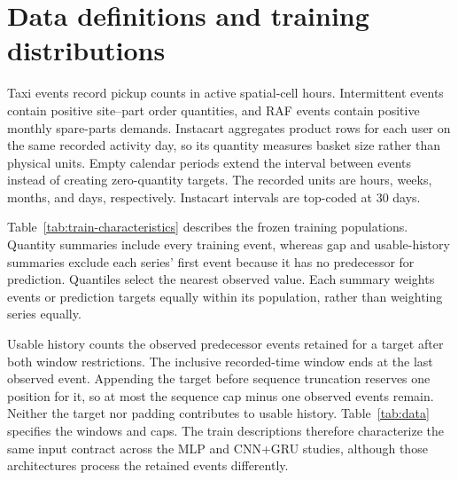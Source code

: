 \documentclass[runningheads]{llncs}
\begin{document}
\section{Data definitions and training distributions}
\label{app:data-characteristics}
Taxi events record pickup counts in active spatial-cell hours. Intermittent
events contain positive site--part order quantities, and RAF events contain
positive monthly spare-parts demands. Instacart aggregates product rows for
each user on the same recorded activity day, so its quantity measures basket
size rather than physical units. Empty calendar periods extend the interval
between events instead of creating zero-quantity targets. The recorded units
are hours, weeks, months, and days, respectively. Instacart intervals are
top-coded at 30 days.

Table~\ref{tab:train-characteristics} describes the frozen training
populations. Quantity summaries include every training event, whereas gap
and usable-history summaries exclude each series' first event because it
has no predecessor for prediction. Quantiles select the nearest observed
value. Each summary weights events or prediction targets equally within
its population, rather than weighting series equally.

Usable history counts the observed predecessor events retained for a target
after both window restrictions. The inclusive recorded-time window ends at
the last observed event. Appending the target before sequence truncation
reserves one position for it, so at most the sequence cap minus one observed
events remain. Neither the target nor padding contributes to usable history.
Table~\ref{tab:data} specifies the windows and caps. The train descriptions
therefore characterize the same input contract across the MLP and CNN+GRU
studies, although those architectures process the retained events differently.
\end{document}
